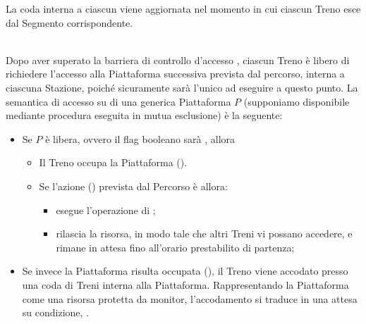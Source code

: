 \begin{description}
		La coda interna a ciascun  viene aggiornata nel momento in cui ciascun Treno esce dal Segmento corrispondente. 
		
		
		\item{}\\
		
		Dopo aver superato la barriera di controllo d'accesso , ciascun Treno è libero di richiedere l'accesso alla Piattaforma successiva prevista dal percorso, interna a ciascuna Stazione, poiché sicuramente sarà l'unico ad eseguire a questo punto. La semantica di accesso su di una generica Piattaforma $P$ (supponiamo disponibile mediante procedura eseguita in mutua esclusione) è la seguente:
		\begin{itemize}
			\item Se $P$ è libera, ovvero il flag booleano  sarà , allora 
				\begin{itemize}
					\item Il Treno occupa la Piattaforma ().
					\item Se l'azione () prevista dal Percorso è  allora:
						\begin{itemize}
							\item esegue l'operazione di ;
							\item rilascia la risorsa, in modo tale che altri Treni vi possano accedere, e rimane in attesa fino all'orario prestabilito di partenza;
						\end{itemize}
				\end{itemize} 
			\item Se invece la Piattaforma risulta occupata (), il Treno viene accodato presso una coda di Treni interna alla Piattaforma. Rappresentando la Piattaforma come una risorsa protetta da monitor, l'accodamento si traduce in una attesa su condizione, .
		\end{itemize}
			

\end{description}
